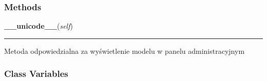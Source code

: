   \subsubsection{Methods}

    \label{ass8_portal:files:models:Plik:__unicode__}

    \vspace{0.5ex}

\hspace{.8\funcindent}\begin{boxedminipage}{\funcwidth}

    \raggedright \textbf{\_\_unicode\_\_}(\textit{self})

    \vspace{-1.5ex}

    \rule{\textwidth}{0.5\fboxrule}
\setlength{\parskip}{2ex}
    Metoda odpowiedzialna za wyświetlenie modelu w panelu administracyjnym

\setlength{\parskip}{1ex}
    \end{boxedminipage}



  \subsubsection{Class Variables}

